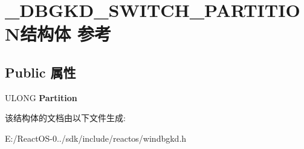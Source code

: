 \hypertarget{struct___d_b_g_k_d___s_w_i_t_c_h___p_a_r_t_i_t_i_o_n}{}\section{\+\_\+\+D\+B\+G\+K\+D\+\_\+\+S\+W\+I\+T\+C\+H\+\_\+\+P\+A\+R\+T\+I\+T\+I\+O\+N结构体 参考}
\label{struct___d_b_g_k_d___s_w_i_t_c_h___p_a_r_t_i_t_i_o_n}
\subsection*{Public 属性}
\begin{DoxyCompactItemize}
\item 
\mbox{\label{struct___d_b_g_k_d___s_w_i_t_c_h___p_a_r_t_i_t_i_o_n_a949de5d85a83843358505c1bc9cec44d}} 
U\+L\+O\+NG {\bfseries Partition}
\end{DoxyCompactItemize}


该结构体的文档由以下文件生成\+:\begin{DoxyCompactItemize}
\item 
E\+:/\+React\+O\+S-\/0../sdk/include/reactos/windbgkd.\+h\end{DoxyCompactItemize}
